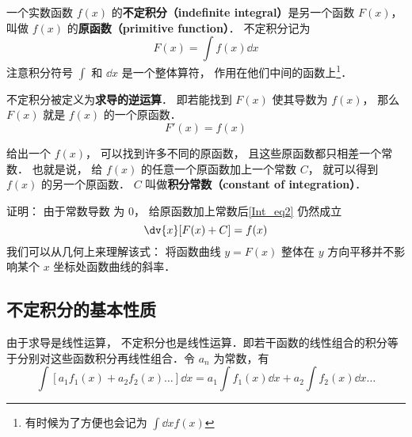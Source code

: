 

一个实数函数 $f(x)$ 的\textbf{不定积分（indefinite integral）}是另一个函数 $F(x)$， 叫做 $f(x)$ 的\textbf{原函数（primitive function）}． 不定积分记为
\begin{equation}\label{Int_eq1}
F(x) = \int f(x) \dd{x} 
\end{equation}
注意积分符号 $\int$ 和 $\dd{x}$ 是一个整体算符， 作用在他们中间的函数上\footnote{有时候为了方便也会记为 $\int\dd{x} f(x)$}．

不定积分被定义为\textbf{求导的逆运算}． 即若能找到 $F(x)$ 使其导数为 $f(x)$， 那么 $F(x)$ 就是  $f(x)$ 的一个原函数．
\begin{equation}\label{Int_eq2}
F'(x) = f(x)
\end{equation}

给出一个 $f(x)$， 可以找到许多不同的原函数， 且这些原函数都只相差一个常数． 也就是说， 给 $f(x)$ 的任意一个原函数加上一个常数 $C$， 就可以得到 $f(x)$ 的另一个原函数． $C$ 叫做\textbf{积分常数（constant of integration）}．

证明： 由于常数导数%
为 $0$， 给原函数加上常数后\autoref{Int_eq2} 仍然成立
\begin{equation}\label{Int_eq3}
\dv{x} [F(x) + C] = f(x)
\end{equation}
我们可以从几何上来理解该式： 将函数曲线 $y = F(x)$ 整体在 $y$ 方向平移并不影响某个 $x$ 坐标处函数曲线的斜率．

\subsection{不定积分的基本性质}%

由于求导是线性运算，%
不定积分也是线性运算．即若干函数的线性组合的积分等于分别对这些函数积分再线性组合．令 $a_n$ 为常数，有
\begin{equation}\label{Int_eq4}
\int [a_1 f_1(x) + a_2 f_2(x)\dots] \dd{x}  = a_1 \int f_1(x) \dd{x} + a_2 \int f_2(x) \dd{x} \dots
\end{equation}

